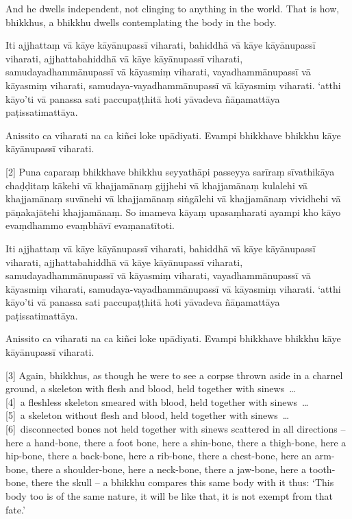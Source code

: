 And he dwells independent, not clinging to anything in the world. That is how,
bhikkhus, a bhikkhu dwells contemplating the body in the body.

\paliPage

Iti ajjhattaṃ vā kāye kāyānupassī viharati, bahiddhā vā kāye kāyānupassī
viharati, ajjhattabahiddhā vā kāye kāyānupassī viharati, samudayadhammānupassī
vā kāyasmiṃ viharati, vayadhammānupassī vā kāyasmiṃ viharati,
samudaya-vayadhammānupassī vā kāyasmiṃ viharati. `atthi kāyo'ti vā panassa sati
paccupaṭṭhitā hoti yāvadeva ñāṇamattāya paṭissatimattāya.

Anissito ca viharati na ca kiñci loke upādiyati. Evampi bhikkhave bhikkhu kāye
kāyānupassī viharati.

[2] Puna caparaṃ bhikkhave bhikkhu seyyathāpi passeyya sarīraṃ sīvathikāya chaḍḍitaṃ
kākehi vā khajjamānaṃ gijjhehi vā khajjamānaṃ kulalehi vā khajjamānaṃ suvānehi
vā khajjamānaṃ siṅgālehi vā khajjamānaṃ vividhehi vā pāṇakajātehi khajjamānaṃ.
So imameva kāyaṃ upasaṃharati ayampi kho kāyo evaṃdhammo evaṃbhāvī
evaṃanatītoti.

Iti ajjhattaṃ vā kāye kāyānupassī viharati, bahiddhā vā kāye kāyānupassī
viharati, ajjhattabahiddhā vā kāye kāyānupassī viharati, samudayadhammānupassī
vā kāyasmiṃ viharati, vayadhammānupassī vā kāyasmiṃ viharati,
samudaya-vayadhammānupassī vā kāyasmiṃ viharati. `atthi kāyo'ti vā panassa sati
paccupaṭṭhitā hoti yāvadeva ñāṇamattāya paṭissatimattāya.

Anissito ca viharati na ca kiñci loke upādiyati. Evampi bhikkhave bhikkhu kāye
kāyānupassī viharati.

\englishPage

[3] Again, bhikkhus, as though he were to see a corpse thrown aside in a
charnel ground, a skeleton with flesh and blood, held together with sinews~\ldots{}\\
{}[4]~a fleshless skeleton smeared with blood, held together with sinews~\ldots{}\\
{}[5]~a skeleton without flesh and blood, held together with sinews~\ldots{}\\
{}[6]~disconnected bones not held together with sinews scattered in all directions
-- here a hand-bone, there a foot bone, here a shin-bone, there a thigh-bone,
here a hip-bone, there a back-bone, here a rib-bone, there a chest-bone, here an
arm-bone, there a shoulder-bone, here a neck-bone, there a jaw-bone, here a
tooth-bone, there the skull -- a bhikkhu compares this same body with it thus:
`This body too is of the same nature, it will be like that, it is not exempt
from that fate.'

